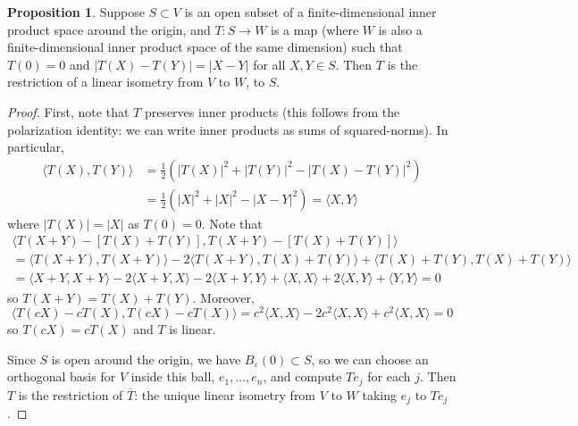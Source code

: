 \documentclass[aps,pra,showpacs,notitlepage,onecolumn,superscriptaddress,nofootinbib]{revtex4-1}
\theoremstyle{definition}
\newtheorem{prop}{Proposition}[section]
\begin{document}
    \begin{prop}
      \label{prop:11}
      Suppose $S \subset V$ is an open subset of a finite-dimensional inner product space around the origin, and $T : S \rightarrow W$ is a map (where $W$ is also a finite-dimensional inner product space of the same dimension)
      such that $T(0) = 0$ and $|T(X) - T(Y)| = |X - Y|$ for all $X, Y \in S$. Then $T$ is the restriction of a linear isometry from $V$ to $W$, to $S$.
    \end{prop}

    \begin{proof}
      First, note that $T$ preserves inner products (this follows from the polarization identity: we can write inner products as sums of squared-norms). In particular,
      \begin{align}
        \langle T(X), T(Y) \rangle &= \frac{1}{2}\left( |T(X)|^2 + |T(Y)|^2 - |T(X) - T(Y)|^2 \right)
        \\ &= \frac{1}{2}\left( |X|^2 + |X|^2 - |X - Y|^2 \right) = \langle X, Y \rangle
      \end{align}
      where $|T(X)| = |X|$ as $T(0) = 0$. Note that
      \begin{multline}
        \langle T(X + Y) - [T(X) + T(Y)], T(X + Y) - [T(X) + T(Y)]\rangle \\ = \langle T(X + Y), T(X + Y) \rangle - 2 \langle T(X + Y), T(X) + T(Y) \rangle + \langle T(X) + T(Y), T(X) + T(Y) \rangle
        \\ = \langle X + Y, X + Y \rangle - 2 \langle X + Y, X \rangle - 2 \langle X + Y, Y \rangle + \langle X, X \rangle + 2 \langle X, Y \rangle + \langle Y, Y \rangle = 0
      \end{multline}
      so $T(X + Y) = T(X) + T(Y)$. Moreover,
      \begin{equation}
        \langle T(cX) - c T(X), T(cX) - cT(X) \rangle = c^2 \langle X, X \rangle - 2 c^2 \langle X, X \rangle + c^2 \langle X, X \rangle = 0
      \end{equation}
      so $T(cX) = cT(X)$ and $T$ is linear.
      \newline

      \noindent Since $S$ is open around the origin, we have $B_{\varepsilon}(0) \subset S$, so we can choose an orthogonal basis for $V$ inside this ball, $e_1, \dots, e_n$, and compute $Te_j$ for each $j$.
      Then $T$ is the restriction of $\overline{T}$: the unique linear isometry from $V$ to $W$ taking $e_j$ to $Te_j$.
    \end{proof}
\end{document}
